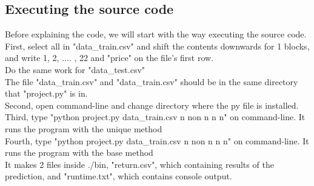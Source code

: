 \subsection{Executing the source code}
Before explaining the code, we will start with the way executing the source code.\\
First, select all in "data\_train.csv" and shift the contents downwards for 1 blocks, and write 1, 2, .... , 22 and "price" on the file's first row. \\
Do the same work for "data\_test.csv"\\
The file "data\_train.csv" and "data\_train.csv" should be in the same directory that "project.py" is in.\\
Second, open command-line and change directory where the py file is installed. \\
Third, type "python project.py data\_train.csv n non n n n" on command-line. It runs the program with the unique method\\
Fourth, type "python project.py data\_train.csv n non n n n" on command-line. It runs the program with the base method\\
It makes 2 files inside ./bin, "return.csv", which containing results of the prediction, and "runtime.txt", which contains console output.\\
